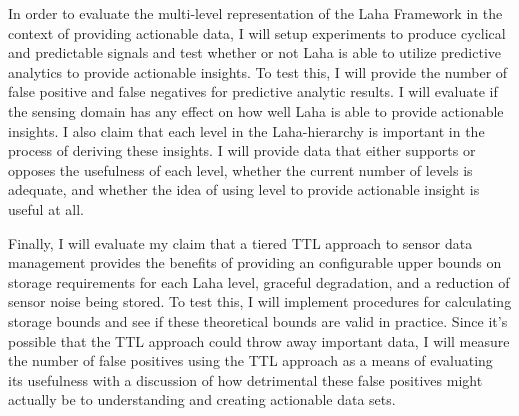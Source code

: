 In order to evaluate the multi-level representation of the Laha Framework in the context of providing actionable data, I will setup experiments to produce cyclical and predictable signals and test whether or not Laha is able to utilize predictive analytics to provide actionable insights. To test this, I will provide the number of false positive and false negatives for predictive analytic results. I will evaluate if the sensing domain has any effect on how well Laha is able to provide actionable insights. I also claim that each level in the Laha-hierarchy is important in the process of deriving these insights. I will provide data that either supports or opposes the usefulness of each level, whether the current number of levels is adequate, and whether the idea of using level to provide actionable insight is useful at all.

Finally, I will evaluate my claim that a tiered TTL approach to sensor data management provides the benefits of providing an configurable upper bounds on storage requirements for each Laha level, graceful degradation, and a reduction of sensor noise being stored. To test this, I will implement procedures for calculating storage bounds and see if these theoretical bounds are valid in practice. Since it's possible that the TTL approach could throw away important data, I will measure the number of false positives using the TTL approach as a means of evaluating its usefulness with a discussion of how detrimental these false positives might actually be to understanding and creating actionable data sets.

